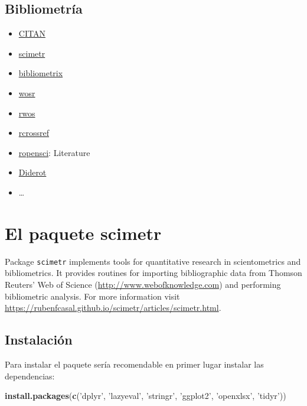 \documentclass[]{book}
\newenvironment{Shaded}{\begin{snugshade}}{\end{snugshade}}
\newcommand{\KeywordTok}[1]{\textcolor[rgb]{0.13,0.29,0.53}{\textbf{#1}}}
\newcommand{\StringTok}[1]{\textcolor[rgb]{0.31,0.60,0.02}{#1}}
\newcommand{\NormalTok}[1]{#1}
\begin{document}
\section{Bibliometría}\label{bibliom-links}

\begin{itemize}
\item
  \href{https://cran.r-project.org/web/packages/CITAN/index.html}{CITAN}
\item
  \href{https://rubenfcasal.github.io/scimetr/index.html}{scimetr}
\item
  \href{http://www.bibliometrix.org}{bibliometrix}
\item
  \href{https://vt-arc.github.io/wosr/index.html}{wosr}
\item
  \href{https://github.com/juba/rwos}{rwos}
\item
  \href{https://docs.ropensci.org/rcrossref}{rcrossref}
\item
  \href{https://ropensci.org/packages/}{ropensci}: Literature
\item
  \href{https://cran.r-project.org/web/packages/Diderot/index.html}{Diderot}
\item
  \ldots{}
\end{itemize}

\chapter{El paquete scimetr}\label{scimetr}

Package \texttt{scimetr} implements tools for quantitative research in
scientometrics and bibliometrics. It provides routines for importing
bibliographic data from Thomson Reuters' Web of Science
(\url{http://www.webofknowledge.com}) and performing bibliometric
analysis. For more information visit
\url{https://rubenfcasal.github.io/scimetr/articles/scimetr.html}.

\section{Instalación}\label{instalacion}

Para instalar el paquete sería recomendable en primer lugar instalar las
dependencias:

\begin{Shaded}
\begin{Highlighting}[]
\KeywordTok{install.packages}\NormalTok{(}\KeywordTok{c}\NormalTok{(}\StringTok{'dplyr'}\NormalTok{, }\StringTok{'lazyeval'}\NormalTok{, }\StringTok{'stringr'}\NormalTok{, }\StringTok{'ggplot2'}\NormalTok{, }\StringTok{'openxlsx'}\NormalTok{, }\StringTok{'tidyr'}\NormalTok{))}
\end{Highlighting}
\end{Shaded}
\end{document}
